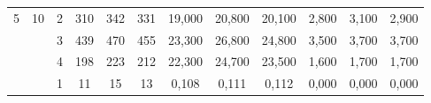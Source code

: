 \documentclass[licencjacka]{pracamgr}
\begin{document}
\begin{table}[H]
{\begin{tabular}{@{}cccccccccccc@{}}
5                                                              & 10                                                     & 2    & 310                                                    & 342                                                    & 331                                                       & 19,000                                                    & 20,800                                                     & 20,100                                                        & 2,800                                                              & 3,100                                                               & 2,900                                                                 \\
                                                               &                                                        & 3    & 439                                                    & 470                                                    & 455                                                       & 23,300                                                    & 26,800                                                     & 24,800                                                        & 3,500                                                              & 3,700                                                               & 3,700                                                                 \\
                                                               &                                                        & 4    & 198                                                    & 223                                                    & 212                                                       & 22,300                                                    & 24,700                                                     & 23,500                                                        & 1,600                                                              & 1,700                                                               & 1,700                                                                 \\ \midrule
                                                               &                                                        & 1    & 11                                                     & 15                                                     & 13                                                        & 0,108                                                     & 0,111                                                      & 0,112                                                         & 0,000                                                              & 0,000                                                               & 0,000                                                                 \\

\end{tabular}}
\end{table}
\end{document}
